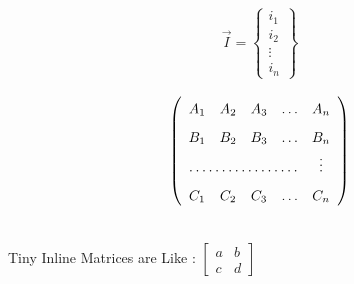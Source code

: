 \documentclass{article}
\begin{document}
	
	\begin{equation*}
		\vec{I} = 
		\left\{ \begin{array}{c}
			i_1 \\
			i_2 \\
			\vdots \\
			i_n
		\end{array} \right\}
	\end{equation*}	
	
	\begin{equation*}
		\left( \def\arraystretch{1.7}
		\begin{array}{ccccc}
			A_1 & A_2 & A_3 & \ldots & A_n \\
			B_1 & B_2 & B_3 & \ldots & B_n \\
			\hdotsfor{4} & \vdots \\
			C_1 & C_2 & C_3 & \ldots & C_n 
		\end{array} \right)
	\end{equation*}	
  
  	\vspace{5mm} \ \\
	Tiny Inline Matrices are Like : 
	$\left[ 
		\begin{smallmatrix}
			a & b \\
			c & d
		\end{smallmatrix}
	\right]$
\end{document}
